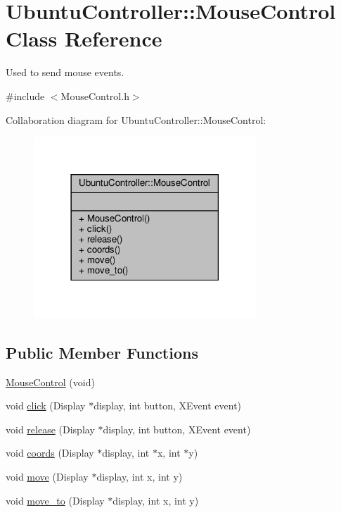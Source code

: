 \hypertarget{class_ubuntu_controller_1_1_mouse_control}{}\section{Ubuntu\+Controller\+:\+:Mouse\+Control Class Reference}
\label{class_ubuntu_controller_1_1_mouse_control}


Used to send mouse events.  




{\ttfamily \#include $<$Mouse\+Control.\+h$>$}



Collaboration diagram for Ubuntu\+Controller\+:\+:Mouse\+Control\+:
\nopagebreak
\begin{figure}[H]
\begin{center}
\leavevmode
\includegraphics[width=237pt]{class_ubuntu_controller_1_1_mouse_control__coll__graph}
\end{center}
\end{figure}
\subsection*{Public Member Functions}
\begin{DoxyCompactItemize}
\item 
\hyperlink{class_ubuntu_controller_1_1_mouse_control_a16de792a08f8e9bbcb656ba0e434507c}{Mouse\+Control} (void)
\item 
void \hyperlink{class_ubuntu_controller_1_1_mouse_control_aef7670a46bf01b4a10767a9942dbdb79}{click} (Display $\ast$display, int button, X\+Event event)
\item 
void \hyperlink{class_ubuntu_controller_1_1_mouse_control_a0b2111e195e98133385cd559972fa779}{release} (Display $\ast$display, int button, X\+Event event)
\item 
void \hyperlink{class_ubuntu_controller_1_1_mouse_control_af69eee658d62f741ab71aa87fbfb75fc}{coords} (Display $\ast$display, int $\ast$x, int $\ast$y)
\item 
void \hyperlink{class_ubuntu_controller_1_1_mouse_control_a73a5e37468d8c1e7be8bcd1ac15c2135}{move} (Display $\ast$display, int x, int y)
\item 
void \hyperlink{class_ubuntu_controller_1_1_mouse_control_a067b9b5aab08ad63fef9dce22b45763f}{move\+\_\+to} (Display $\ast$display, int x, int y)
\end{DoxyCompactItemize}


